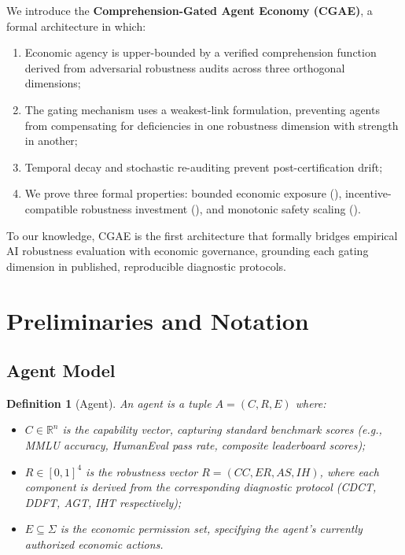 \documentclass[11pt,a4paper]{article}
\newtheorem{definition}{Definition}
\newcommand{\R}{\mathbb{R}}
\begin{document}
We introduce the \textbf{Comprehension-Gated Agent Economy (CGAE)}, a formal architecture in which:
\begin{enumerate}[label=(\roman*)]
  \item Economic agency is upper-bounded by a verified comprehension function derived from adversarial robustness audits across three orthogonal dimensions;
  \item The gating mechanism uses a weakest-link formulation, preventing agents from compensating for deficiencies in one robustness dimension with strength in another;
  \item Temporal decay and stochastic re-auditing prevent post-certification drift;
  \item We prove three formal properties: bounded economic exposure (), incentive-compatible robustness investment (), and monotonic safety scaling ().
\end{enumerate}

To our knowledge, CGAE is the first architecture that formally bridges empirical AI robustness evaluation with economic governance, grounding each gating dimension in published, reproducible diagnostic protocols.

\section{Preliminaries and Notation}

\subsection{Agent Model}

\begin{definition}[Agent]
An agent is a tuple $A = (C, R, E)$ where:
\begin{itemize}[nosep]
  \item $C \in \R^n$ is the \emph{capability vector}, capturing standard benchmark scores (e.g., MMLU accuracy, HumanEval pass rate, composite leaderboard scores);
  \item $R \in [0,1]^4$ is the \emph{robustness vector} $R = (CC, ER, AS, IH)$, where each component is derived from the corresponding diagnostic protocol (CDCT, DDFT, AGT, IHT respectively);
  \item $E \subseteq \Sigma$ is the \emph{economic permission set}, specifying the agent's currently authorized economic actions.
\end{itemize}
\end{definition}
\end{document}
